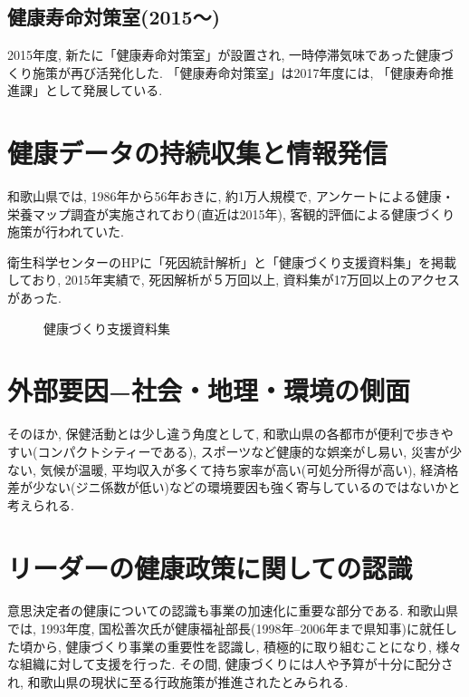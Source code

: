 \subsection{健康寿命対策室(2015〜)}
2015年度, 新たに「健康寿命対策室」が設置され, 一時停滞気味であった健康づくり施策が再び活発化した. 	「健康寿命対策室」は2017年度には, 「健康寿命推進課」として発展している.

\section{健康データの持続収集と情報発信}
和歌山県では, 1986年から56年おきに, 約1万人規模で, アンケートによる健康・栄養マップ調査が実施されており(直近は2015年), 客観的評価による健康づくり施策が行われていた.

衛生科学センターのHPに「死因統計解析」と「健康づくり支援資料集」を掲載しており, 2015年実績で, 死因解析が５万回以上, 資料集が17万回以上のアクセスがあった.
\begin{figure}[h!]
	\begin{center}
		\caption{健康づくり支援資料集}\label{fig1}
	\end{center}
\end{figure}




\section{外部要因−社会・地理・環境の側面}

そのほか, 保健活動とは少し違う角度として, 和歌山県の各都市が便利で歩きやすい(コンパクトシティーである), スポーツなど健康的な娯楽がし易い, 災害が少ない, 気候が温暖, 平均収入が多くて持ち家率が高い(可処分所得が高い), 経済格差が少ない(ジニ係数が低い)などの環境要因も強く寄与しているのではないかと考えられる.


\section{リーダーの健康政策に関しての認識}
意思決定者の健康についての認識も事業の加速化に重要な部分である.
和歌山県では, 1993年度, 国松善次氏が健康福祉部長(1998年--2006年まで県知事)に就任した頃から,
健康づくり事業の重要性を認識し, 積極的に取り組むことになり, 様々な組織に対して支援を行った.
その間, 健康づくりには人や予算が十分に配分され, 和歌山県の現状に至る行政施策が推進されたとみられる.

